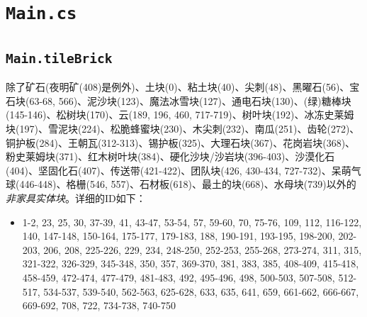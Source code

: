 \section{\texttt{Main.cs}}\label{src:Main}

\subsection{\texttt{Main.tileBrick}}\label{src:tileBrick}
除了矿石(夜明矿(408)是例外)、土块(0)、粘土块(40)、尖刺(48)、黑曜石(56)、宝石块(63-68, 566)、泥沙块(123)、魔法冰雪块(127)、通电石块(130)、(绿)糖棒块(145-146)、松树块(170)、云(189, 196, 460, 717-719)、树叶块(192)、冰冻史莱姆块(197)、雪泥块(224)、松脆蜂蜜块(230)、木尖刺(232)、南瓜(251)、齿轮(272)、铜护板(284)、王朝瓦(312-313)、锡护板(325)、大理石块(367)、花岗岩块(368)、粉史莱姆块(371)、红木树叶块(384)、硬化沙块/沙岩块(396-403)、沙漠化石(404)、坚固化石(407)、传送带(421-422)、团队块(426, 430-434, 727-732)、呆萌气球(446-448)、格栅(546, 557)、石材板(618)、最土的块(668)、水母块(739)以外的\emph{非家具实体块}。详细的ID如下：
\begin{itemize}
  \item 1-2, 23, 25, 30, 37-39, 41, 43-47, 53-54, 57, 59-60, 70, 75-76, 109, 112, 116-122, 140, 147-148, 150-164, 175-177, 179-183, 188, 190-191, 193-195, 198-200, 202-203, 206, 208, 225-226, 229, 234, 248-250, 252-253, 255-268, 273-274, 311, 315, 321-322, 326-329, 345-348, 350, 357, 369-370, 381, 383, 385, 408-409, 415-418, 458-459, 472-474, 477-479, 481-483, 492, 495-496, 498, 500-503, 507-508, 512-517, 534-537, 539-540, 562-563, 625-628, 633, 635, 641, 659, 661-662, 666-667, 669-692, 708, 722, 734-738, 740-750
\end{itemize}

